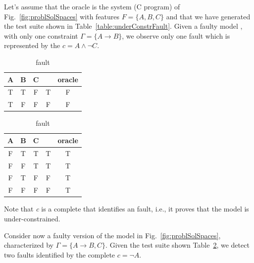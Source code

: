\begin{tikzborder}{\cite{Gargantini16:validation}}
\begin{tikzborder}{\cite{gargantini_combinatorial_2017}}
\begin{tikzborder}{\cite{garn2019}}
\begin{tikzborder}{\cite{arcaini2019achieving}}
\begin{tikzborder}{\cite{arcaini2019varivolution}}
		\begin{exmp}\label{ex:example1}
			\bb Let's assume that the oracle is the system (C program) of Fig.~\ref{fig:problSolSpaces} with features $F = \{A,B,C\}$ and that we have generated the test suite shown in Table~\ref{table:underConstrFault}. Given a faulty model \mfU, with only one constraint $\Gamma = \{A\rightarrow B\}$, we observe only one fault which is represented by the \fcc $c = A \wedge \neg C$.\be
			\begin{table}[!htb]
				\caption{Test suites with faults (in gray)}
				\label{table:testsandfaults1}
				\begin{subtable}[t]{.5\columnwidth}
					\centering
					\caption{\underConstr fault}
					\label{table:underConstrFault}
					\begin{tabular}{c|c|c||c|c}
						A & B & C & \mfU & oracle\\
						\hline 
						T & T & F & \cg T & \cg F\\%
						T & F & F & F & F\\
					\end{tabular}
				\end{subtable}%
				\begin{subtable}[t]{.5\columnwidth}
					\centering
					\caption{\overConstr fault}
					\label{table:overConstrFault}
					\begin{tabular}{c|c|c||c|c}
						A & B & C & \mfO & oracle\\
						\hline 
						F & T & T & T & T\\
						F & F & T & T & T\\
						F & T & F & \cg F & \cg T\\%
						F & F & F & \cg F & \cg T\\%
					\end{tabular}
				\end{subtable}%
			\end{table}
			\bb Note that \emph{c} is a complete \fcc that identifies an \underConstr fault, i.e., it proves that the model is under-constrained. \be
		\end{exmp}
		\bb
		\begin{exmp}\label{ex:example2}
			Consider now a faulty version \mfO of the model in Fig.~\ref{fig:problSolSpaces}, characterized by $\Gamma = \{A\rightarrow B, C\}$. Given the test suite shown Table~\ref{table:overConstrFault}, we detect two \overConstr faults identified by the complete \fcc $c = \neg A$.
		\end{exmp} \be
		

\end{tikzborder}
\end{tikzborder}
\end{tikzborder}
\end{tikzborder}
\end{tikzborder}
